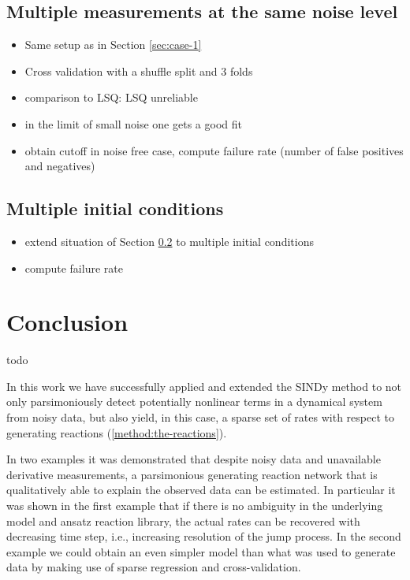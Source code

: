 \documentclass[oneside, abstracton, titlepage]{scrartcl}
\newenvironment{colbox}[1]
{\newcommand\colboxcolor{#1}%
	\begin{lrbox}{\selvestebox}%
		\begin{minipage}{\dimexpr\columnwidth-2\fboxsep\relax}}
		{\end{minipage}\end{lrbox}%
	\begin{center}
		\colorbox[HTML]{\colboxcolor}{\usebox{\selvestebox}}
\end{center}}
\begin{document}
	\subsection{Multiple measurements at the same noise level}\label{sec:case-2}
	
	\begin{itemize}
		\item Same setup as in Section \ref{sec:case-1}
		\item Cross validation with a shuffle split and 3 folds
		\item comparison to LSQ: LSQ unreliable
		\item in the limit of small noise one gets a good fit
		\item obtain cutoff in noise free case, compute failure rate (number of false positives and negatives)
	\end{itemize}

	\subsection{Multiple initial conditions}\label{sec:case-3}
	
	\begin{itemize}
		\item extend situation of Section \ref{sec:case-3} to multiple initial conditions
		\item compute failure rate
	\end{itemize}
    
	\section{Conclusion}
	\begin{colbox}{F8E0E0}
		todo
	\end{colbox}
	In this work we have successfully applied and extended the SINDy method to not only parsimoniously detect potentially nonlinear terms in a dynamical system from noisy data, but also yield, in this case, a sparse set of rates with respect to generating reactions (\ref{method:the-reactions}).

	In two examples it was demonstrated that despite noisy data and unavailable derivative measurements, a parsimonious generating reaction network that is qualitatively able to explain the observed data can be estimated.
	In particular it was shown in the first example that if there is no ambiguity in the underlying model and ansatz reaction library, the actual rates can be recovered with decreasing time step, i.e., increasing resolution of the jump process.
	In the second example we could obtain an even simpler model than what was used to generate data by making use of sparse regression and cross-validation.
\end{document}
